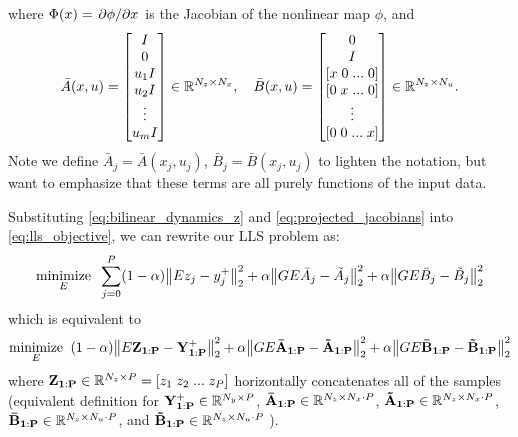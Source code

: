 \documentclass{article}
\begin{document}
where $\Phi(x) = \pdv*{\phi}{x}$ is the Jacobian of the nonlinear map $\phi$, and
\begin{equation}
  \bar{A}(x,u) =  \begin{bmatrix} 
    I \\ 0 \\ u_1 I \\ u_2 I \\ \vdots \\ u_m I 
  \end{bmatrix} \in \mathbb{R}^{N_z \times N_x}, \quad
  \bar{B}(x,u) = \begin{bmatrix} 
    0 \\ 
    I \\ 
    [x \; 0 \; ... \; 0] \\
    [0 \; x \; ... \; 0] \\
    \vdots \\
    [0 \; 0 \; ... \; x] \\
  \end{bmatrix} \in \mathbb{R}^{N_z \times N_u}.
\end{equation}
Note we define $\bar{A}_j = \bar{A}(x_j,u_j)$, $\bar{B}_j = \bar{B}(x_j,u_j)$ to lighten 
the notation, but want to emphasize that these terms are all purely functions of the input
data.

Substituting \eqref{eq:bilinear_dynamics_z} and \eqref{eq:projected_jacobians} into
\eqref{eq:lls_objective}, we can rewrite our LLS problem as:
\begin{align}
  \underset{E}{\text{minimize}} \;\; 
  \sum_{j=0}^P
  (1-\alpha) \norm{E z_j - y_j^+}_2^2 + 
  \alpha  \norm{G E \bar{A}_j - \tilde{A}_j}_2^2 + 
  \alpha  \norm{G E \bar{B}_j - \tilde{B}_j}_2^2 
\end{align}
which is equivalent to
\begin{align} \label{opt:lls_matrices}
  \underset{E}{\text{minimize}} \;\; 
  (1-\alpha) \norm{E \mathbf{Z_{1:P}} - \mathbf{Y^+_{1:P}} }_2^2 + 
  \alpha  \norm{G E \mathbf{\bar{A}_{1:P}} - \mathbf{\tilde{A}_{1:P}}}_2^2 + 
  \alpha  \norm{G E \mathbf{\bar{B}_{1:P}} - \mathbf{\tilde{B}_{1:P}}}_2^2
\end{align}
where $\mathbf{Z_{1:P}} \in \mathbb{R}^{N_z \times P} = [z_1 \; z_2 \; ... \; z_P]$ horizontally
concatenates all of the samples (equivalent definition for 
$\mathbf{Y^+_{1:P}} \in \mathbb{R}^{N_y \times P}$, 
$\mathbf{\bar{A}_{1:P}} \in \mathbb{R}^{N_z \times N_x \cdot P}$, 
$\mathbf{\tilde{A}_{1:P}} \in \mathbb{R}^{N_z \times N_x \cdot P}$,
$\mathbf{\bar{B}_{1:P}} \in \mathbb{R}^{N_z \times N_u \cdot P}$, and 
$\mathbf{\tilde{B}_{1:P}} \in \mathbb{R}^{N_z \times N_u \cdot P}$ ).
\end{document}

